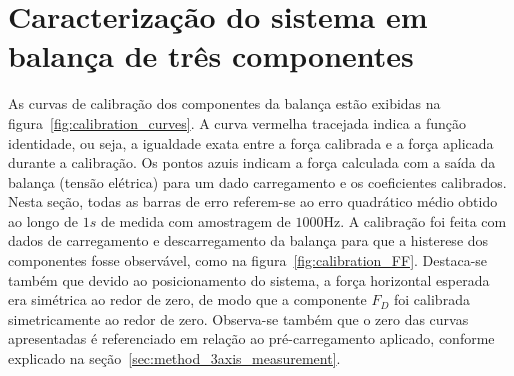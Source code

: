 \section{Caracterização do sistema em balança de três componentes}\label{sec:result_characterization}

As curvas de calibração dos componentes da balança estão exibidas na figura~\ref{fig:calibration_curves}. A curva vermelha tracejada indica a função identidade, ou seja, a igualdade exata entre a força calibrada e a força aplicada durante a calibração. Os pontos azuis indicam a força calculada com a saída da balança (tensão elétrica) para um dado carregamento e os coeficientes calibrados. Nesta seção, todas as barras de erro referem-se ao erro quadrático médio obtido ao longo de \(1s\) de medida com amostragem de \(1000\mathrm{Hz}\). A calibração foi feita com dados de carregamento e descarregamento da balança para que a histerese dos componentes fosse observável, como na figura~\ref{fig:calibration_FF}. Destaca-se também que devido ao posicionamento do sistema, a força horizontal esperada era simétrica ao redor de zero, de modo que a componente \(F_D\) foi calibrada simetricamente ao redor de zero. Observa-se também que o zero das curvas apresentadas é referenciado em relação ao pré-carregamento aplicado, conforme explicado na seção~\ref{sec:method_3axis_measurement}.

